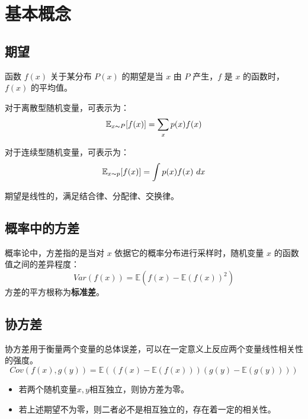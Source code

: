 \documentclass[cn,11pt,chinese,blue,bibstyle=ieeetr]{elegantbook}
\begin{document}
{\section{基本概念}

\subsection{期望}

函数 $f(x)$ 关于某分布 $P(x)$ 的期望是当 $x$ 由 $P$ 产生，$f$ 是 $x$ 的函数时，$f(x)$ 的平均值。

对于离散型随机变量，可表示为：
\begin{equation}
\mathbb{E}_{x \thicksim P}[f(x)] = \sum_x p(x)f(x)
\end{equation}

对于连续型随机变量，可表示为：
\begin{equation}
\mathbb{E}_{x \thicksim p}[f(x)] = \int p(x)f(x) \ dx
\end{equation}

期望是线性的，满足结合律、分配律、交换律。

\subsection{概率中的方差}

概率论中，方差指的是当对 $x$ 依据它的概率分布进行采样时，随机变量 $x$ 的函数值之间的差异程度：
\begin{equation}
Var(f(x)) = \mathbb{E} \left( f(x) - \mathbb{E} (f(x))^2 \right)
\end{equation}
方差的平方根称为\textbf{标准差}。

\subsection{协方差}

协方差用于衡量两个变量的总体误差，可以在一定意义上反应两个变量线性相关性的强度。
\begin{equation} 
Cov(f(x), g(y)) = \mathbb{E} \left( (f(x) - \mathbb{E}(f(x)))(g(y) - \mathbb{E}(g(y))) \right)
\end{equation}

\begin{itemize}
\item 若两个随机变量$x,y$相互独立，则协方差为零。
\item 若上述期望不为零，则二者必不是相互独立的，存在着一定的相关性。
\end{itemize}


}
\end{document}
